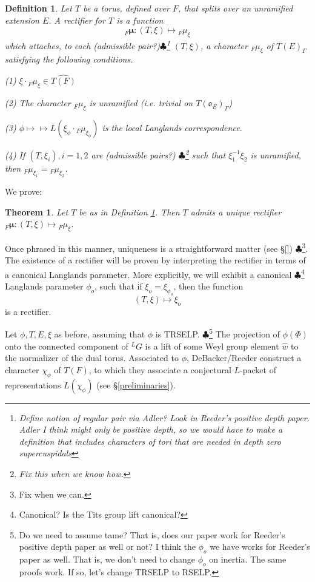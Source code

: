 \documentclass[11pt]{amsart}
\theoremstyle{plain}
\newtheorem{theorem}[enumi]{Theorem}
\newtheorem{definition}[enumi]{Definition}
\newcommand{\MAxxx}[1]{$\clubsuit$\footnote{#1}}
\begin{document}
\begin{definition}\label{rectifierdefinition}
Let $T$ be a torus, defined over $F$, that splits over an unramified extension $E$.  A \emph{rectifier} for $T$ is a function $${}_F \boldsymbol\mu : (T, \xi) \mapsto {}_F \mu_{\xi}$$
which attaches, to each (admissible pair?)\MAxxx{Define notion of regular pair via Adler?  Look in Reeder's positive depth paper.  Adler I think might only be positive depth, so we would have to make a definition that includes characters of tori that are needed in depth zero supercuspidals} $(T, \xi)$, a character ${}_F \mu_{\xi}$ of $T(E)_{\Gamma}$ satisfying the following conditions.

(1) $\xi \cdot {}_F \mu_{\xi} \in \widehat{T(F)}$

(2) The character ${}_F \mu_{\xi}$ is unramified (i.e. trivial on $T(\mathfrak{o}_E)_{\Gamma}$)

(3) $\phi \mapsto \mapsto L(\xi_{\phi} \cdot {}_F \mu_{\xi_{\phi}})$ is the local Langlands correspondence.

(4) If $(T, \xi_i), i = 1,2$ are (admissible pairs?) \MAxxx{Fix this when we know how.} such that $\xi_1^{-1} \xi_2$ is unramified, then ${}_F \mu_{\xi_1} = {}_F \mu_{\xi_2}$.
\end{definition}

We prove:

\begin{theorem} Let $T$ be as in Definition \ref{rectifierdefinition}.  Then $T$ admits a unique rectifier ${}_F \boldsymbol\mu : (T, \xi) \mapsto {}_F \mu_{\xi}$.
\end{theorem}

Once phrased in this manner, uniqueness is a straightforward matter (see \S\ref{}) \MAxxx{Fix when we can.}.  The existence of a rectifier will be proven by interpreting the rectifier in terms of a canonical Langlands parameter.  More explicitly, we will exhibit a canonical \MAxxx{Canonical?  Is the Tits group lift canonical?} Langlands parameter $\phi_{o}$, such that if $\xi_o = \xi_{\phi_o}$, then the function $$(T, \xi) \mapsto \xi_o$$ is a rectifier.

Let $\phi, T, E, \xi$ as before, assuming that $\phi$ is TRSELP. \MAxxx{Do we need to assume tame?  That is, does our paper work for Reeder's positive depth paper as well or not?  I think the $\phi_o$ we have works for Reeder's paper as well.  That is, we don't need to change $\phi_o$ on inertia. The same proofs work.  If so, let's change TRSELP to RSELP.}  The projection of $\phi(\Phi)$ onto the connected component of ${}^L G$ is a lift of some Weyl group element $\hat{w}$ to the normalizer of the dual torus.  Associated to $\phi$, DeBacker/Reeder construct a character $\chi_{\phi}$ of $T(F)$, to which they associate a conjectural $L$-packet of representations $L(\chi_{\phi})$ (see \S \ref{preliminaries}).
\end{document}
